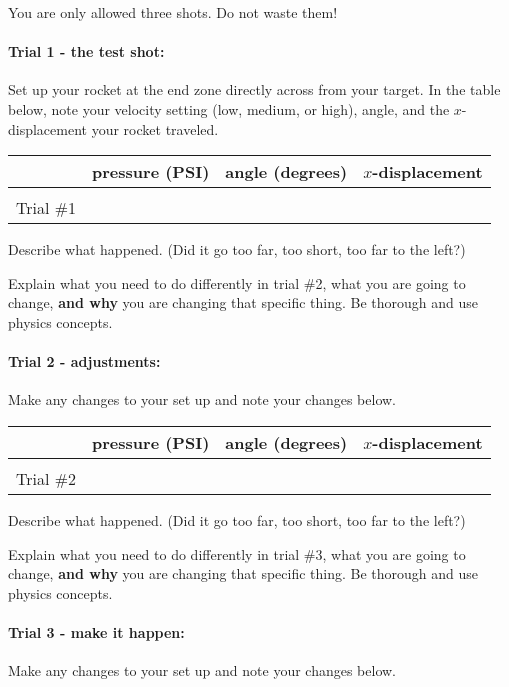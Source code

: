 \documentclass[10pt]{exam}
\begin{document}
You are only allowed three shots.  Do not waste them!

\paragraph{Trial 1 - the test shot:}  Set up your rocket at the end zone directly across from your target.  In the table below, note your velocity setting (low, medium, or high), angle, and the $x$-displacement your rocket traveled.

\noindent
\begin{tabular}{|*4{l|}}
  \hline
  & pressure (PSI) & angle (degrees) & $x$-displacement\\\hline
  &&& \\
  Trial \#1 &&& \\
  \hline
\end{tabular}

\noindent
Describe what happened. (Did it go too far, too short, too far to the left?)
\vspace{5em}

\noindent
Explain what you need to do differently in trial \#2, what you are going to change, {\bf and why} you are changing that specific thing.  Be thorough and use physics concepts.
\vspace{5em}


\paragraph{Trial 2 - adjustments:}  Make any changes to your set up and note your changes below.

\noindent
\begin{tabular}{|*4{l|}}
  \hline
  & pressure (PSI) & angle (degrees) & $x$-displacement\\\hline
  &&& \\
  Trial \#2 &&& \\
  \hline
\end{tabular}

\noindent
Describe what happened. (Did it go too far, too short, too far to the left?)
\vspace{5em}

\noindent
Explain what you need to do differently in trial \#3, what you are going to change, {\bf and why} you are changing that specific thing.  Be thorough and use physics concepts.
\vspace{5em}

\paragraph{Trial 3 - make it happen:}  Make any changes to your set up and note your changes below.
\end{document}
